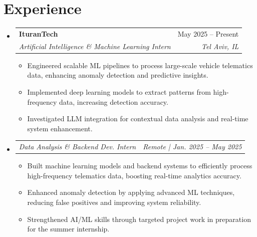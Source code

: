 \documentclass[letterpaper,11pt]{article}
\makeatletter
\newcommand{\resumeItem}[1]{
  \item\small{
    {#1 \vspace{-4pt}}
  }
}
\newcommand{\resumeSubheading}[4]{
  \vspace{-2pt}\item
    \begin{tabular*}{0.97\textwidth}[t]{l@{\extracolsep{\fill}}r}
      \textbf{#1} & #2 \\
      \textit{\small#3} & \textit{\small #4} \\
    \end{tabular*}\vspace{-7pt}
}
\newcommand{\resumeSubSubheading}[2]{
    \item
    \begin{tabular*}{0.97\textwidth}{l@{\extracolsep{\fill}}r}
      \textit{\small#1} & \textit{\small #2} \\
    \end{tabular*}\vspace{-7pt}
}
\newcommand{\resumeSubHeadingListStart}{\begin{itemize}[leftmargin=0.15in, label={}]}
\newcommand{\resumeSubHeadingListEnd}{\end{itemize}}
\newcommand{\resumeItemListStart}{\begin{itemize}}
\newcommand{\resumeItemListEnd}{\end{itemize}\vspace{-5pt}}
\makeatother
\begin{document}



\section{Experience}
  \resumeSubHeadingListStart

    \resumeSubheading
      {IturanTech}{May 2025 -- Present}
      {Artificial Intelligence \& Machine Learning Intern}{Tel Aviv, IL}
      \resumeItemListStart
        \resumeItem{Engineered scalable ML pipelines to process large-scale vehicle telematics data, enhancing anomaly detection and predictive insights.}
        \resumeItem{Implemented deep learning models to extract patterns from high-frequency data, increasing detection accuracy.}
        \resumeItem{Investigated LLM integration for contextual data analysis and real-time system enhancement.}
      \resumeItemListEnd
      
   \resumeSubSubheading
    {Data Analysis \& Backend Dev. Intern}{Remote | Jan. 2025 -- May 2025}
    \resumeItemListStart
        \resumeItem{Built machine learning models and backend systems to efficiently process high-frequency telematics data, boosting real-time analytics accuracy.}
        \resumeItem{Enhanced anomaly detection by applying advanced ML techniques, reducing false positives and improving system reliability.}
        \resumeItem{Strengthened AI/ML skills through targeted project work in preparation for the summer internship.}
    \resumeItemListEnd
   \resumeSubHeadingListEnd
\end{document}
